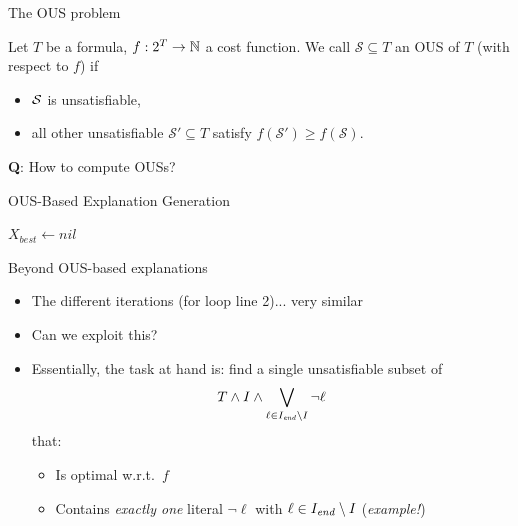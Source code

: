 \documentclass[12pt,aspectratio=169]{beamer}
\begin{document}
\begin{frame}{The OUS problem}
\begin{definition}
   Let $T$ be a formula, $f:2^{T} \to \mathbb{N}$ a cost function. We call %
    $\mathcal{S} \subseteq T$ an OUS of $T$ (with respect to $f$) if \begin{itemize}                                      
      \item $\mathcal{S}$ is unsatisfiable,
      \item all other unsatisfiable $\mathcal{S}'\subseteq T$ satisfy $f(\mathcal{S}')\geq f(\mathcal{S})$.
    \end{itemize}
\end{definition}
\pause
\textbf{Q}: How to compute OUSs?
\end{frame}

\begin{frame}{OUS-Based Explanation Generation}
 
\begin{algorithm}[H]
  \caption{$\onestep(T,f,I,\Iend)$}
  \label{alg:oneStep}
$X_{best} \gets \mathit{nil}$\;
\end{algorithm}

\end{frame}

\begin{frame}{Beyond OUS-based explanations}
 \begin{itemize}
  \item The different iterations (for loop line 2)... very similar
  \item Can we exploit this? 
  \pause
  \item Essentially, the task at hand is: find a single unsatisfiable subset of 
  \[T\land I \land \bigvee_{\ell\in I_{\mathit{end}}\setminus I}\lnot \ell\]
  that:
  \begin{itemize}
   \item Is optimal w.r.t.\ $f$
   \item Contains \emph{exactly one} literal $\lnot \ell$ with $\ell \in I_{\mathit{end}}\setminus I$ (\emph{example!})
  \end{itemize}

 \end{itemize}

\end{frame}
\end{document}
